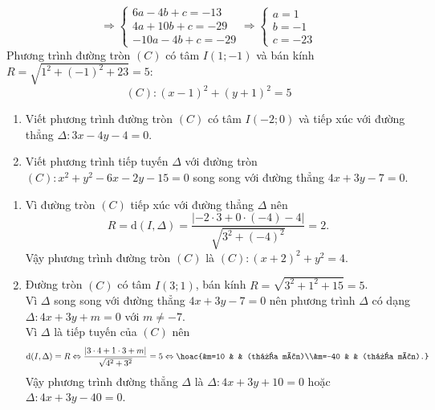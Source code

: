 \begin{bt}
{\begin{enumerate}[a)]
	\[ \Rightarrow \left\{ {\begin{array}{*{20}{c}}
	  {6a - 4b + c =  - 13} \\ 
	  {4a + 10b + c =  - 29} \\ 
	  { - 10a - 4b + c =  - 29} 
	\end{array} \Rightarrow \left\{ {\begin{array}{*{20}{c}}
	  {a = 1} \\ 
	  {b =  - 1} \\ 
	  {c =  - 23} 
	\end{array}} \right.} \right.\]
	Phương trình đường tròn $(C)$ có tâm $I(1 ;-1)$ và bán kính\\ $R=\sqrt{1^2+(-1)^2+23}=5$:
		\[(C): (x-1)^2+(y+1)^2=5\]
	\end{enumerate}
}
\end{bt}

\begin{bt}%
\begin{enumerate}
\item Viết phương trình đường tròn $(C)$ có tâm $I(-2;0)$ và tiếp xúc với đường thẳng $\Delta \colon 3x-4y-4=0$.
\item Viết phương trình tiếp tuyến $\Delta$ với đường tròn $(C)\colon x^2+y^2-6x-2y-15=0$ song song với đường thẳng $4x+3y-7=0$.
\end{enumerate}
\loigiai
{
\begin{enumerate}
\item Vì đường tròn $(C)$ tiếp xúc với đường thẳng $\Delta$ nên
$$R=\mathrm{d}(I,\Delta)=\dfrac{|-2\cdot3+0\cdot(-4)-4|}{\sqrt{3^2+(-4)^2}}=2.$$
Vậy phương trình đường tròn $(C)$ là $(C)\colon (x+2)^2+y^2=4$.
\item Đường tròn $(C)$ có tâm $I(3;1)$, bán kính $R=\sqrt{3^2+1^2+15}=5$.\\
Vì $\Delta$ song song với đường thẳng $4x+3y-7=0$ nên phương trình $\Delta$ có dạng $\Delta\colon 4x+3y+m=0$ với $m\ne -7$.\\
Vì $\Delta$ là tiếp tuyến của $(C)$ nên
$$\mathrm{d}(I,\Delta)=R\Leftrightarrow \dfrac{|3\cdot 4+1\cdot 3+m|}{\sqrt{4^2+3^2}}=5\Leftrightarrow\hoac{&m=10 & & (thỏa mãn)\\&m=-40  & & (thỏa mãn).}$$
Vậy phương trình đường thẳng $\Delta$ là $\Delta\colon 4x+3y+10=0$ hoặc $\Delta\colon 4x+3y-40=0$.
\end{enumerate}
}
\end{bt}

